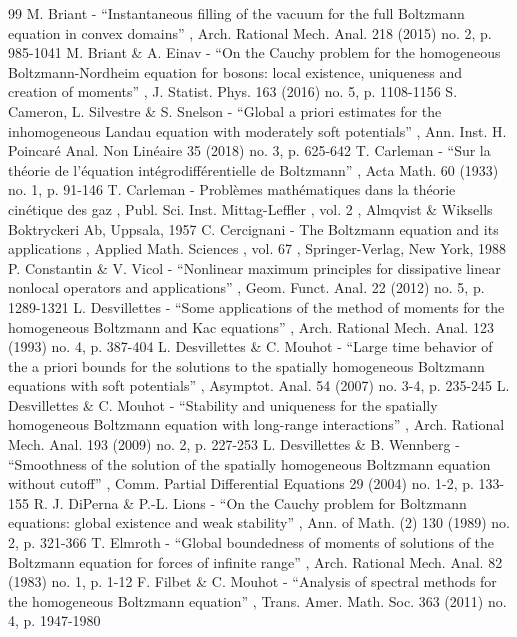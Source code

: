 \documentclass[11pt]{article}
\theoremstyle{plain}
\theoremstyle{definition}
\numberwithin{equation}{section}
\begin{document}
\begin{thebibliography}{99}
 M. Briant - “Instantaneous filling of the vacuum for the full Boltzmann equation in convex domains” , Arch. Rational Mech. Anal. 218 (2015) no. 2, p. 985-1041
 M. Briant \& A. Einav - “On the Cauchy problem for the homogeneous Boltzmann-Nordheim equation for bosons: local existence, uniqueness and creation of moments” , J. Statist. Phys. 163 (2016) no. 5, p. 1108-1156
 S. Cameron, L. Silvestre \& S. Snelson - “Global a priori estimates for the inhomogeneous Landau equation with moderately soft potentials” , Ann. Inst. H. Poincaré Anal. Non Linéaire 35 (2018) no. 3, p. 625-642
 T. Carleman - “Sur la théorie de l’équation intégrodifférentielle de Boltzmann” , Acta Math. 60 (1933) no. 1, p. 91-146
 T. Carleman - Problèmes mathématiques dans la théorie cinétique des gaz , Publ. Sci. Inst. Mittag-Leffler , vol. 2 , Almqvist \& Wiksells Boktryckeri Ab, Uppsala, 1957
 C. Cercignani - The Boltzmann equation and its applications , Applied Math. Sciences , vol. 67 , Springer-Verlag, New York, 1988
 P. Constantin \& V. Vicol - “Nonlinear maximum principles for dissipative linear nonlocal operators and applications” , Geom. Funct. Anal. 22 (2012) no. 5, p. 1289-1321
 L. Desvillettes - “Some applications of the method of moments for the homogeneous Boltzmann and Kac equations” , Arch. Rational Mech. Anal. 123 (1993) no. 4, p. 387-404
 L. Desvillettes \& C. Mouhot - “Large time behavior of the a priori bounds for the solutions to the spatially homogeneous Boltzmann equations with soft potentials” , Asymptot. Anal. 54 (2007) no. 3-4, p. 235-245
 L. Desvillettes \& C. Mouhot - “Stability and uniqueness for the spatially homogeneous Boltzmann equation with long-range interactions” , Arch. Rational Mech. Anal. 193 (2009) no. 2, p. 227-253
 L. Desvillettes \& B. Wennberg - “Smoothness of the solution of the spatially homogeneous Boltzmann equation without cutoff” , Comm. Partial Differential Equations 29 (2004) no. 1-2, p. 133-155
 R. J. DiPerna \& P.-L. Lions - “On the Cauchy problem for Boltzmann equations: global existence and weak stability” , Ann. of Math. (2) 130 (1989) no. 2, p. 321-366
 T. Elmroth - “Global boundedness of moments of solutions of the Boltzmann equation for forces of infinite range” , Arch. Rational Mech. Anal. 82 (1983) no. 1, p. 1-12
 F. Filbet \& C. Mouhot - “Analysis of spectral methods for the homogeneous Boltzmann equation” , Trans. Amer. Math. Soc. 363 (2011) no. 4, p. 1947-1980

\end{thebibliography}
\end{document}
